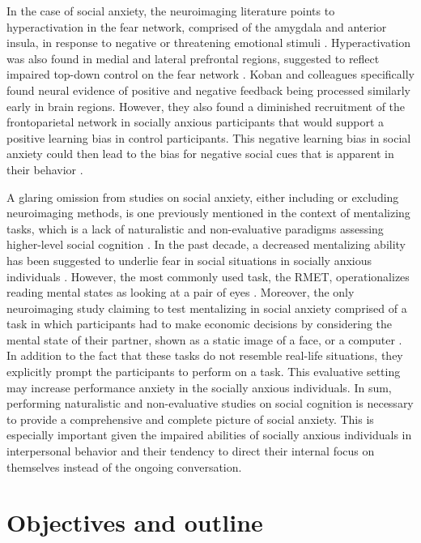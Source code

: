 In the case of social anxiety, the neuroimaging literature points to hyperactivation in the fear network, comprised of the amygdala and anterior insula, in response to negative or threatening emotional stimuli \citep{bruhl2014,etkin2007}. Hyperactivation was also found in medial and lateral prefrontal regions, suggested to reflect impaired top-down control on the fear network \citep{bruhl2014,koban2023}. Koban and colleagues specifically found neural evidence of positive and negative feedback being processed similarly early in brain regions. However, they also found a diminished recruitment of the frontoparietal network in socially anxious participants that would support a positive learning bias in control participants. This negative learning bias in social anxiety could then lead to the bias for negative social cues that is apparent in their behavior \citep{alvi2020}. 

A glaring omission from studies on social anxiety, either including or excluding neuroimaging methods, is one previously mentioned in the context of mentalizing tasks, which is a lack of naturalistic and non-evaluative paradigms assessing higher-level social cognition \citep{freitas-ferrari2010}. In the past decade, a decreased mentalizing ability has been suggested to underlie fear in social situations in socially anxious individuals \citep{hezel2014}. However, the most commonly used task, the RMET, operationalizes reading mental states as looking at a pair of eyes \citep[for a review]{baez2023}. Moreover, the only neuroimaging study claiming to test mentalizing in social anxiety comprised of a task in which participants had to make economic decisions by considering the mental state of their partner, shown as a static image of a face, or a computer \citep{sripada2009}. In addition to the fact that these tasks do not resemble real-life situations, they explicitly prompt the participants to perform on a task. This evaluative setting may increase performance anxiety in the socially anxious individuals. In sum, performing naturalistic and non-evaluative studies on social cognition is necessary to provide a comprehensive and complete picture of social anxiety. This is especially important given the impaired abilities of socially anxious individuals in interpersonal behavior and their tendency to direct their internal focus on themselves instead of the ongoing conversation.


\section{Objectives and outline}


